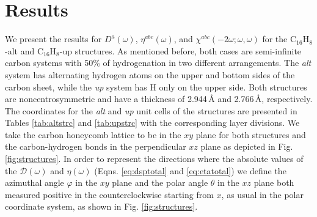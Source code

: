 \documentclass[pss]{wiley2sp} %
\begin{document}
\section{Results}\label{sec:results}

We present the results for {$D^{a}(\omega)$}, {$\eta^{abc}(\omega)$}, and
$\chi^{abc}(-2\omega;\omega,\omega)$ for the C$_{16}$H$_{8}$-alt and
C$_{16}$H$_{8}$-up structures. As mentioned before, both cases are 
semi-infinite carbon systems with 50\% of hydrogenation in two different
arrangements. The \emph{alt} system has alternating hydrogen atoms on the
upper and bottom sides of the carbon sheet, while the \emph{up} system has H
only on the upper side. Both structures are noncentrosymmetric and have a
thickness of 2.944\,{\AA} and 2.766\,{\AA}, respectively. The coordinates for
the \emph{alt} and \emph{up} unit cells of the structures are presented in
Tables \ref{tab:altstrc} and \ref{tab:upstrc} with the corresponding layer
divisions. We take the carbon honeycomb lattice to be in the $xy$ plane for
both structures and the carbon-hydrogen bonds in the perpendicular $xz$ plane
as depicted in Fig.\ref{fig:structures}. In order to represent the directions
where the absolute values of the $\mathcal{D}(\omega)$ and $\eta(\omega)$
(Eqns. \eqref{eq:dsptotal} and \eqref{eq:etatotal}) we define the azimuthal
angle $\varphi$ in the $xy$ plane and the polar angle $\theta$ in the $xz$
plane both measured positive in the counterclockwise starting from $x$, as
usual in the polar coordinate system, as shown in Fig. \ref{fig:structures}.
\end{document}
